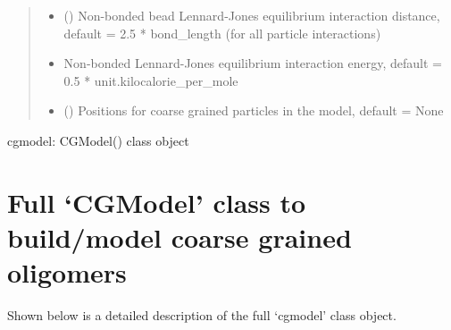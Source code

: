 \documentclass[letterpaper,12pt,english,openany,oneside]{sphinxmanual}
\begin{document}
\begin{fulllineitems}
\begin{quote}
\begin{description}
\begin{itemize}
\item {} 
 () \textendash{} Non-bonded bead Lennard-Jones equilibrium interaction distance, default = 2.5 * bond\_length (for all particle interactions)

\item {} 
 \textendash{} Non-bonded Lennard-Jones equilibrium interaction energy, default = 0.5 * unit.kilocalorie\_per\_mole

\item {} 
 (\sphinxstyleliteralemphasis{\sphinxupquote{( }}\sphinxstyleliteralemphasis{\sphinxupquote{ ( }}\sphinxstyleliteralemphasis{\sphinxupquote{ ) }}\sphinxstyleliteralemphasis{\sphinxupquote{)}}) \textendash{} Positions for coarse grained particles in the model, default = None

\end{itemize}

\end{description}\end{quote}

cgmodel: CGModel() class object

\end{fulllineitems}



\section{Full ‘CGModel’ class to build/model coarse grained oligomers}
\label{\detokenize{cg_model:full-cgmodel-class-to-build-model-coarse-grained-oligomers}}
Shown below is a detailed description of the full ‘cgmodel’ class object.

\label{\detokenize{cg_model:module-cg_model.cgmodel}}
\end{document}
